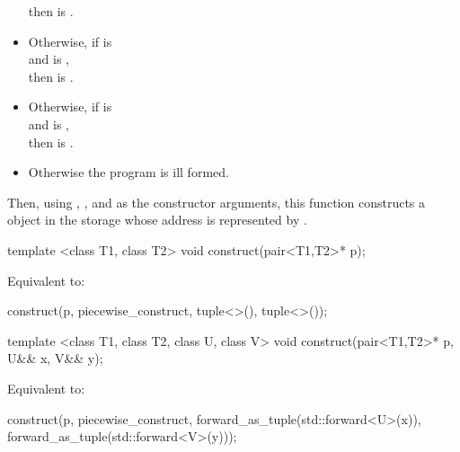 \begin{itemdescr}
\begin{itemize}
then  is .
\item
Otherwise, if  is 
\\
and
 is ,
\\
then  is .
\item
Otherwise, if  is 
\\
and
 is ,
\\
then
 is .
\item
Otherwise the program is ill formed.
\end{itemize}

Then, using , , and 
as the constructor arguments,
this function constructs a  object
in the storage whose address is represented by .
\end{itemdescr}

%
\begin{itemdecl}
template <class T1, class T2>
  void construct(pair<T1,T2>* p);
\end{itemdecl}

\begin{itemdescr}
\pnum
\effects
Equivalent to:
\begin{codeblock}
construct(p, piecewise_construct, tuple<>(), tuple<>());
\end{codeblock}
\end{itemdescr}

%
\begin{itemdecl}
template <class T1, class T2, class U, class V>
  void construct(pair<T1,T2>* p, U&& x, V&& y);
\end{itemdecl}

\begin{itemdescr}
\pnum
\effects
Equivalent to:
\begin{codeblock}
construct(p, piecewise_construct,
          forward_as_tuple(std::forward<U>(x)),
          forward_as_tuple(std::forward<V>(y)));
\end{codeblock}
\end{itemdescr}

